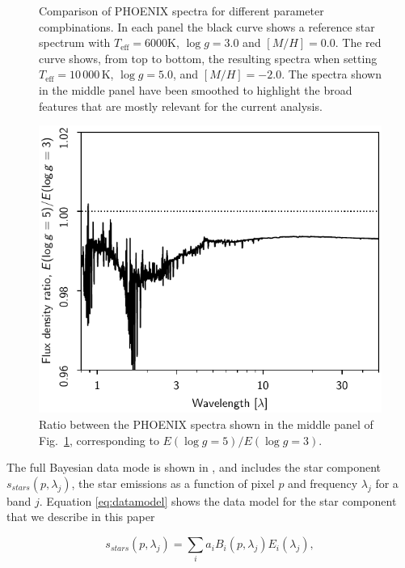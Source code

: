\documentclass{aa}
\begin{document}
\begin{figure}
  \caption{Comparison of PHOENIX spectra for different parameter compbinations. In each panel the black curve shows a reference star spectrum with $T_{\mathrm{eff}}= 6000$K, $\log g = 3.0$ and $[M/H]= 0.0$. The red curve shows, from top to bottom, the resulting spectra when setting $T_\mathrm{eff}=10\,000\,\mathrm{K}$, $\log g = 5.0$, and $[M/H]= -2.0$. The spectra shown in the middle panel have been smoothed to highlight the broad features that are mostly relevant for the current analysis.}
  \label{fig:catalogueSEDs}
\end{figure}

\begin{figure}
\includegraphics[width=\columnwidth]{figs/gaia/star_SED_logg_ratio.pdf}
\caption{Ratio between the PHOENIX spectra shown in the middle panel of Fig.~\ref{fig:catalogueSEDs}, corresponding to $E(\log g = 5)/E(\log g  = 3)$.}
  \label{fig:logg_ratio}
\end{figure}


The full Bayesian data mode is shown in \cite{CG02_01}, and includes the star component $s_{stars}(p, \lambda_j)$, the star emissions as a function of pixel $p$ and frequency $\lambda_j$ for a band $j$. Equation \ref{eq:datamodel} shows the data model for the star component that we describe in this paper


\begin{equation}
s_{stars}(p, \lambda_j) = \sum_i a_i B_i(p, \lambda_j) E_i(\lambda_j),
\label{eq:datamodel}
\end{equation}
\end{document}
